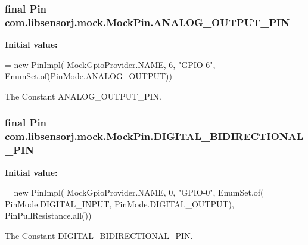 \subsubsection[{A\+N\+A\+L\+O\+G\+\_\+\+O\+U\+T\+P\+U\+T\+\_\+\+P\+I\+N}]{\setlength{\rightskip}{0pt plus 5cm}final Pin com.\+libsensorj.\+mock.\+Mock\+Pin.\+A\+N\+A\+L\+O\+G\+\_\+\+O\+U\+T\+P\+U\+T\+\_\+\+P\+I\+N\hspace{0.3cm}{\ttfamily [static]}}\label{classcom_1_1libsensorj_1_1mock_1_1MockPin_ac0cb98f53fad4d229f1999253428e252}
{\bfseries Initial value\+:}
\begin{DoxyCode}
= \textcolor{keyword}{new} PinImpl(
            MockGpioProvider.NAME, 6, \textcolor{stringliteral}{"GPIO-6"},
            EnumSet.of(PinMode.ANALOG\_OUTPUT))
\end{DoxyCode}
The Constant A\+N\+A\+L\+O\+G\+\_\+\+O\+U\+T\+P\+U\+T\+\_\+\+P\+I\+N. \hypertarget{classcom_1_1libsensorj_1_1mock_1_1MockPin_a4dc35775be540ac9c62c2797c08a7ed7}{}
\subsubsection[{D\+I\+G\+I\+T\+A\+L\+\_\+\+B\+I\+D\+I\+R\+E\+C\+T\+I\+O\+N\+A\+L\+\_\+\+P\+I\+N}]{\setlength{\rightskip}{0pt plus 5cm}final Pin com.\+libsensorj.\+mock.\+Mock\+Pin.\+D\+I\+G\+I\+T\+A\+L\+\_\+\+B\+I\+D\+I\+R\+E\+C\+T\+I\+O\+N\+A\+L\+\_\+\+P\+I\+N\hspace{0.3cm}{\ttfamily [static]}}\label{classcom_1_1libsensorj_1_1mock_1_1MockPin_a4dc35775be540ac9c62c2797c08a7ed7}
{\bfseries Initial value\+:}
\begin{DoxyCode}
= \textcolor{keyword}{new} PinImpl(
            MockGpioProvider.NAME, 0, \textcolor{stringliteral}{"GPIO-0"}, EnumSet.of(
                    PinMode.DIGITAL\_INPUT, PinMode.DIGITAL\_OUTPUT),
            PinPullResistance.all())
\end{DoxyCode}
The Constant D\+I\+G\+I\+T\+A\+L\+\_\+\+B\+I\+D\+I\+R\+E\+C\+T\+I\+O\+N\+A\+L\+\_\+\+P\+I\+N. \hypertarget{classcom_1_1libsensorj_1_1mock_1_1MockPin_ab3330359048ec50eec255e0ab6309f48}{}
